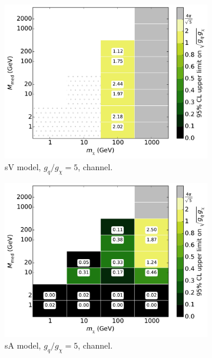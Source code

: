 \begin{figure}
\begin{subfigure}[t]{0.32\textwidth}
    \centering
    \includegraphics[width=1.\textwidth]{figures/grid_basepoints_SVD_rat5_monoWZ.pdf}
    \caption{sV model, $g_q/g_{\chi} = 5$, \monoWZ channel.}
    \vspace{0.75cm}
  \end{subfigure}
  \begin{subfigure}[t]{0.32\textwidth}
    \centering
    \includegraphics[width=1.\textwidth]{figures/grid_basepoints_SAD_rat5_monojet.pdf}
    \caption{sA model, $g_q/g_{\chi} = 5$, \monojet channel.}
  \end{subfigure}
  \begin{subfigure}[t]{0.32\textwidth}
    \centering

\end{subfigure}
\end{figure}
